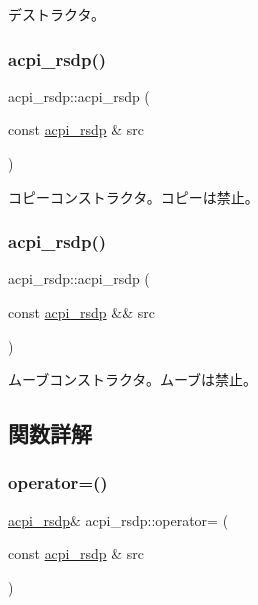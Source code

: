 デストラクタ。 \hypertarget{classacpi__rsdp_a120265388dd84dbc6fb69ecb94d49eb1}{}\label{classacpi__rsdp_a120265388dd84dbc6fb69ecb94d49eb1} 
\subsubsection{\texorpdfstring{acpi\+\_\+rsdp()}{acpi\_rsdp()}\hspace{0.1cm}{\footnotesize\ttfamily [3/4]}}
{\footnotesize\ttfamily acpi\+\_\+rsdp\+::acpi\+\_\+rsdp (\begin{DoxyParamCaption}\item[{const \hyperlink{classacpi__rsdp}{acpi\+\_\+rsdp} \&}]{src }\end{DoxyParamCaption})\hspace{0.3cm}{\ttfamily [delete]}}

コピーコンストラクタ。コピーは禁止。 \hypertarget{classacpi__rsdp_a90d04a5ea31ef4a9c8c03dad7da1c87b}{}\label{classacpi__rsdp_a90d04a5ea31ef4a9c8c03dad7da1c87b} 
\subsubsection{\texorpdfstring{acpi\+\_\+rsdp()}{acpi\_rsdp()}\hspace{0.1cm}{\footnotesize\ttfamily [4/4]}}
{\footnotesize\ttfamily acpi\+\_\+rsdp\+::acpi\+\_\+rsdp (\begin{DoxyParamCaption}\item[{const \hyperlink{classacpi__rsdp}{acpi\+\_\+rsdp} \&\&}]{src }\end{DoxyParamCaption})\hspace{0.3cm}{\ttfamily [delete]}}

ムーブコンストラクタ。ムーブは禁止。 

\subsection{関数詳解}
\hypertarget{classacpi__rsdp_a837f521b7a9ea61afaa32c0f65580a78}{}\label{classacpi__rsdp_a837f521b7a9ea61afaa32c0f65580a78} 
\subsubsection{\texorpdfstring{operator=()}{operator=()}\hspace{0.1cm}{\footnotesize\ttfamily [1/2]}}
{\footnotesize\ttfamily \hyperlink{classacpi__rsdp}{acpi\+\_\+rsdp}\& acpi\+\_\+rsdp\+::operator= (\begin{DoxyParamCaption}\item[{const \hyperlink{classacpi__rsdp}{acpi\+\_\+rsdp} \&}]{src }\end{DoxyParamCaption})\hspace{0.3cm}{\ttfamily [delete]}}


